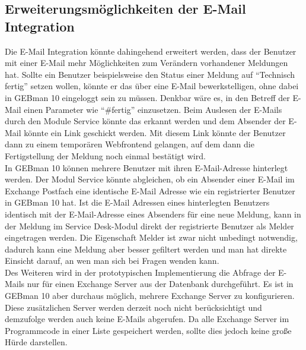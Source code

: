 \subsection{Erweiterungsmöglichkeiten der E-Mail Integration}
\noindent
Die E-Mail Integration könnte dahingehend erweitert werden, dass der Benutzer mit einer E-Mail mehr Möglichkeiten zum Verändern vorhandener Meldungen hat. Sollte ein Benutzer beispielsweise den Status einer Meldung auf \enquote{Technisch fertig} setzen wollen, könnte er das über eine E-Mail bewerkstelligen, ohne dabei in GEBman 10 eingeloggt sein zu müssen. Denkbar wäre es, in den Betreff der E-Mail einen Parameter wie \enquote{\#fertig} einzusetzen. Beim Auslesen der E-Mails durch den Module Service könnte das erkannt werden und dem Absender der E-Mail könnte ein Link geschickt werden. Mit diesem Link könnte der Benutzer dann zu einem temporären Webfrontend gelangen, auf dem dann die Fertigstellung der Meldung noch einmal bestätigt wird.\\

\noindent
In GEBman 10 können mehrere Benutzer mit ihren E-Mail-Adresse hinterlegt werden. Der Modul Service könnte abgleichen, ob ein Absender einer E-Mail im Exchange Postfach eine identische E-Mail Adresse wie ein registrierter Benutzer in GEBman 10 hat. Ist die E-Mail Adressen eines hinterlegten Benutzers identisch mit der E-Mail-Adresse eines Absenders für eine neue Meldung, kann in der Meldung im Service Desk-Modul direkt der registrierte Benutzer als Melder eingetragen werden. Die Eigenschaft Melder ist zwar nicht unbedingt notwendig, dadurch kann eine Meldung aber besser gefiltert werden und man hat direkte Einsicht darauf, an wen man sich bei Fragen wenden kann.\\

\noindent
Des Weiteren wird in der prototypischen Implementierung die Abfrage der E-Mails nur für einen Exchange Server aus der Datenbank durchgeführt. Es ist in GEBman 10 aber durchaus möglich, mehrere Exchange Server zu konfigurieren. Diese zusätzlichen Server werden derzeit noch nicht berücksichtigt und demzufolge werden auch keine E-Mails abgerufen. Da alle Exchange Server im Programmcode in einer Liste gespeichert werden, sollte dies jedoch keine große Hürde darstellen.

